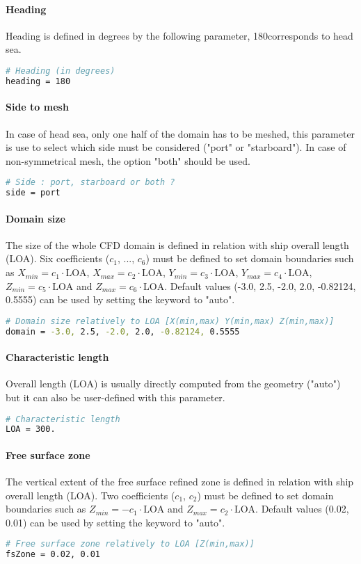 \paragraph{Heading}
Heading is defined in degrees by the following parameter, 180\degree  corresponds to head sea.
\begin{lstlisting}[language=bash]
# Heading (in degrees)
heading = 180
\end{lstlisting}

\paragraph{Side to mesh}
In case of head sea, only one half of the domain has to be meshed, this parameter is use to select which side must be considered ("port" or "starboard"). In case of non-symmetrical mesh, the option "both" should be used.
\begin{lstlisting}[language=bash]
# Side : port, starboard or both ?
side = port
\end{lstlisting}

\paragraph{Domain size}
The size of the whole CFD domain is defined in relation with ship overall length (LOA). Six coefficients ($c_1$, ..., $c_6$) must be defined to set domain boundaries such as $X_{min}= c_1 \cdot \text{LOA}$, $X_{max}= c_2 \cdot \text{LOA}$, $Y_{min}= c_3 \cdot \text{LOA}$, $Y_{max}= c_4 \cdot \text{LOA}$, $Z_{min}= c_5 \cdot \text{LOA}$ and $Z_{max}= c_6 \cdot \text{LOA}$. Default values (-3.0, 2.5, -2.0, 2.0, -0.82124, 0.5555) can be used by setting the keyword to "auto".
\begin{lstlisting}[language=bash]
# Domain size relatively to LOA [X(min,max) Y(min,max) Z(min,max)]
domain = -3.0, 2.5, -2.0, 2.0, -0.82124, 0.5555
\end{lstlisting}

\paragraph{Characteristic length}
Overall length (LOA) is usually directly computed from the geometry ("auto") but it can also be user-defined with this parameter.
\begin{lstlisting}[language=bash]
# Characteristic length
LOA = 300.
\end{lstlisting}

\paragraph{Free surface zone}
The vertical extent of the free surface refined zone is defined in relation with ship overall length (LOA). Two coefficients ($c_1$, $c_2$) must be defined to set domain boundaries such as $Z_{min}= -c_1 \cdot \text{LOA}$ and $Z_{max}= c_2 \cdot \text{LOA}$. Default values (0.02, 0.01) can be used by setting the keyword to "auto".
\begin{lstlisting}[language=bash]
# Free surface zone relatively to LOA [Z(min,max)]
fsZone = 0.02, 0.01
\end{lstlisting}

